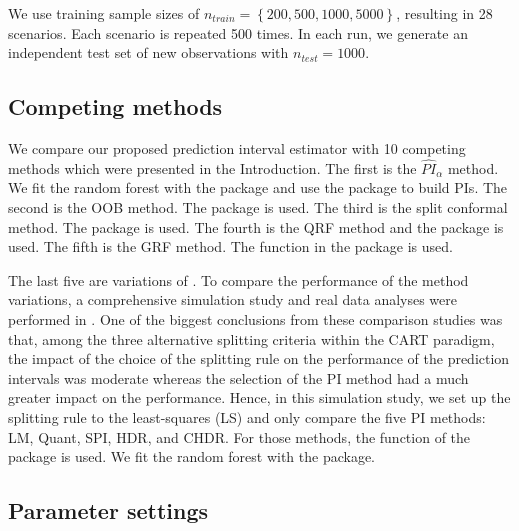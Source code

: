 We use training sample sizes of $n_{train}=\left \{200,500,1000,5000\right \}$, resulting in 28 scenarios. Each scenario is repeated 500 times. In each run, we generate an independent test set of new observations with $n_{test}= 1000$.

\subsection{Competing methods}

We compare our proposed prediction interval estimator with 10 competing methods which were presented in the Introduction. The first is the $\widehat{PI}_\alpha$ method. We fit the random forest with the  package and use the  package to build PIs. The second is the OOB method. The  package is used. The third is the split conformal method. The  package is used. The fourth is the QRF method and the  package is used. The fifth is the GRF method. The function  in the  package is used. 

The last five are variations of \citet{roy_prediction_2020}. To compare the performance of the method variations, a comprehensive simulation study and real data analyses were performed in \cite{roy_prediction_2020}. One of the biggest conclusions from these comparison studies was that, among the three alternative splitting criteria within the CART paradigm, the impact of the choice of the splitting rule on the performance of the prediction intervals was moderate whereas the selection of the PI method had a much greater impact on the performance. Hence, in this simulation study, we set up the splitting rule to the least-squares (LS) and only compare the five PI methods: LM, Quant, SPI, HDR, and CHDR. For those methods, the  function of the  package is used. We fit the random forest with the  package. 

\subsection{Parameter settings}

